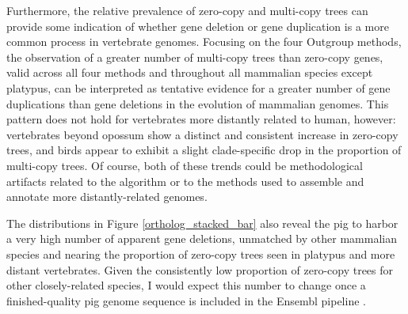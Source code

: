 Furthermore, the relative prevalence of zero-copy and multi-copy trees
can provide some indication of whether gene deletion or gene
duplication is a more common process in vertebrate genomes. Focusing
on the four Outgroup \subtr methods, the observation of a greater
number of multi-copy trees than zero-copy genes, valid across all four
\subtr methods and throughout all mammalian species except platypus,
can be interpreted as tentative evidence for a greater number of gene
duplications than gene deletions in the evolution of mammalian
genomes. This pattern does not hold for vertebrates more distantly
related to human, however: vertebrates beyond opossum show a distinct
and consistent increase in zero-copy trees, and birds appear to
exhibit a slight clade-specific drop in the proportion of multi-copy
trees. Of course, both of these trends could be methodological
artifacts related to the \hclust algorithm or to the methods used to
assemble and annotate more distantly-related genomes.

The distributions in Figure \ref{ortholog_stacked_bar} also reveal the
pig to harbor a very high number of apparent gene deletions, unmatched
by other mammalian species and nearing the proportion of zero-copy
trees seen in platypus and more distant vertebrates. Given the
consistently low proportion of zero-copy trees for other
closely-related species, I would expect this number to change once a
finished-quality pig genome sequence is included in the Ensembl
pipeline \citep{Archibald2010}.

